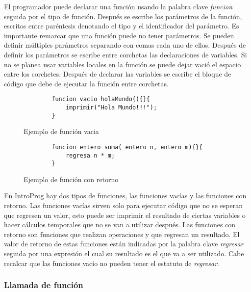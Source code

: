 El programador puede declarar una función usando la palabra clave \emph{funcion} seguida por el tipo de función. Después se escribe los parámetros de la función, escritos entre paréntesis denotando el tipo y el identificador del parámetro. Es importante remarcar que una función puede no tener parámetros. Se pueden definir múltiples parámetros separando con comas cada uno de ellos. Después de definir los parámetros se escribe entre corchetas las declaraciones de variables. Si no se planea usar variables locales en la función se puede dejar vació el espacio entre los corchetes. Después de declarar las variables se escribe el bloque de código que debe de ejecutar la función entre corchetas.

\begin{figure}[!htbp]
    \centering
    
    \begin{lstlisting}
        funcion vacio holaMundo(){}{
            imprimir("Hola Mundo!!!");
        }
    \end{lstlisting}
    \caption{Ejemplo de función vacia}
\end{figure}
\FloatBarrier

\begin{figure}[!htbp]
    \centering
    
    \begin{lstlisting}
        funcion entero suma( entero n, entero m){}{
            regresa n * m;
        }
    \end{lstlisting}
    \caption{Ejemplo de función con retorno}
\end{figure}
\FloatBarrier

En IntroProg hay dos tipos de funciones, las funciones vacías y las funciones con retorno. Las funciones vacías sirven solo para ejecutar código que no se esperan que regresen un valor, esto puede ser imprimir el resultado de ciertas variables o hacer cálculos temporales que no se van a utilizar después. Las funciones con retorno son funciones que realizan operaciones y que regresan un resultado. El valor de retorno de estas funciones están indicadas por la palabra clave \emph{regresar} seguida por una expresión el cual su resultado es el que va a ser utilizado. Cabe recalcar que las funciones vacío no pueden tener el estatuto de \emph{regresar}.


\subsubsection{Llamada de función}

